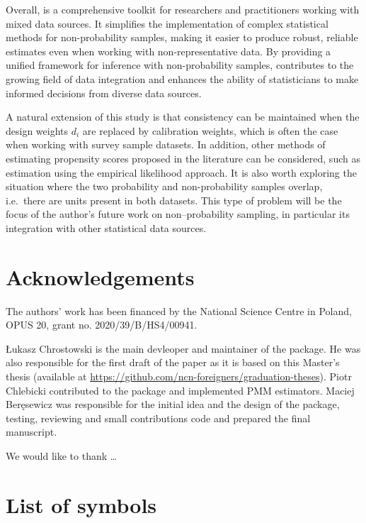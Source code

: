\documentclass[
]{jss}
\begin{document}
Overall,  is a comprehensive toolkit for researchers and
practitioners working with mixed data sources. It simplifies the
implementation of complex statistical methods for non-probability
samples, making it easier to produce robust, reliable estimates even
when working with non-representative data. By providing a unified
framework for inference with non-probability samples, 
contributes to the growing field of data integration and enhances the
ability of statisticians to make informed decisions from diverse data
sources.

A natural extension of this study is that consistency can be maintained
when the design weights \(d_i\) are replaced by calibration weights,
which is often the case when working with survey sample datasets. In
addition, other methods of estimating propensity scores proposed in the
literature can be considered, such as estimation using the empirical
likelihood approach. It is also worth exploring the situation where the
two probability and non-probability samples overlap, i.e.~there are
units present in both datasets. This type of problem will be the focus
of the author's future work on non--probability sampling, in particular
its integration with other statistical data sources.

\section{Acknowledgements}\label{sec-acknowledgements}

The authors' work has been financed by the National Science Centre in
Poland, OPUS 20, grant no. 2020/39/B/HS4/00941.

Łukasz Chrostowski is the main devleoper and maintainer of the package.
He was also responsible for the first draft of the paper as it is based
on this Master's thesis (available at
\url{https://github.com/ncn-foreigners/graduation-theses}). Piotr
Chlebicki contributed to the package and implemented PMM estimators.
Maciej Beręsewicz was responsible for the initial idea and the design of
the package, testing, reviewing and small contributions code and
prepared the final manuscript.

We would like to thank \ldots{}

\clearpage

\appendix

\section{List of symbols}\label{list-of-symbols}
\end{document}
